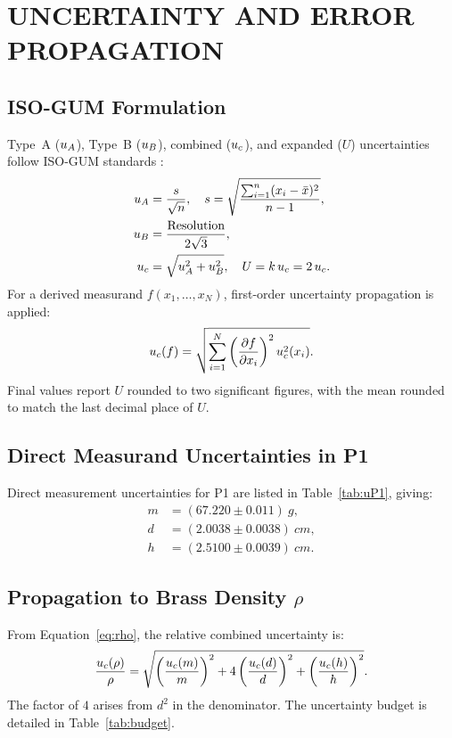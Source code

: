 \documentclass[a4paper, 12pt]{article}
\begin{document}
\section{UNCERTAINTY AND ERROR PROPAGATION}
        \subsection{ISO-GUM Formulation}
        Type~A ($u_{A}$), Type~B ($u_{B}$), combined ($u_{c}$), and expanded ($U$) uncertainties follow ISO-GUM standards \parencite{JCGM2008GUM}:
        \begin{align}
            u_{A} &= \frac{s}{\sqrt{n}},\quad s=\sqrt{\frac{\sum_{i=1}^{n}(x_i-\bar{x})^2}{n-1}},\label{eq:uA}\\
            u_{B} &= \frac{\text{Resolution}}{2\sqrt{3}},\label{eq:uB}\\
            u_{c} &= \sqrt{u_{A}^{2}+u_{B}^{2}},\quad U=k\,u_{c}=2\,u_{c}.\label{eq:U}
        \end{align}
        For a derived measurand $f(x_1,\dots,x_N)$, first-order uncertainty propagation is applied:
        \begin{equation}
            u_{c}(f)=\sqrt{\sum_{i=1}^{N}\left(\frac{\partial f}{\partial x_i}\right)^{2}u_{c}^{2}(x_i)}.
            \label{eq:prop}
        \end{equation}
        Final values report $U$ rounded to two significant figures, with the mean rounded to match the last decimal place of $U$.

        \subsection{Direct Measurand Uncertainties in P1}
        Direct measurement uncertainties for P1 are listed in Table~\ref{tab:uP1}, giving:
        \begin{align*}
            m &= (67.220\pm0.011)\ \si{g},\\
            d &= (2.0038\pm0.0038)\ \si{cm},\\
            h &= (2.5100\pm0.0039)\ \si{cm}.
        \end{align*}

        \subsection{Propagation to Brass Density \texorpdfstring{$\rho$}{rho}}
        From Equation~\eqref{eq:rho}, the relative combined uncertainty is:
        \begin{equation}
            \frac{u_{c}(\rho)}{\rho}=\sqrt{\left(\frac{u_{c}(m)}{m}\right)^{2}+4\left(\frac{u_{c}(d)}{d}\right)^{2}+\left(\frac{u_{c}(h)}{h}\right)^{2}}.
            \label{eq:urho}
        \end{equation}
        The factor of $4$ arises from $d^2$ in the denominator. The uncertainty budget is detailed in Table~\ref{tab:budget}.
\end{document}
